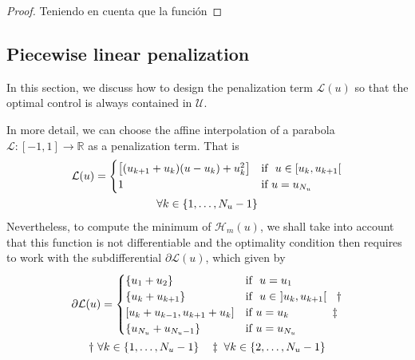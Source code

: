 \begin{proof}
    Teniendo en cuenta que la función 
\end{proof}

\subsection{Piecewise linear penalization}

In this section, we discuss how to design the penalization term $\mathcal{L}(u)$ so that the optimal control is always contained in $\mathcal{U}$. 

In more detail, we can choose the affine interpolation of a parabola $\mathcal{L}:[-1,1] \rightarrow \mathbb{R}$ as a penalization term. That is
\begin{gather}\label{PLP}
    \mathcal{L}(u) = \begin{cases}
        \big[ (u_{k+1}+u_{k}) (u-u_k) + u_k^2 \big] & \text{if }  u \in [u_k,u_{k+1}[ \\
        1 & \text{if } u = u_{N_u} 
    \end{cases} \\
    \notag \forall k \in \{1,\dots,N_u-1\}
\end{gather}
%
Nevertheless, to compute the minimum of $\mathcal{H}_m(u)$, we shall take into account that this function is not differentiable and the optimality condition then requires to work with the subdifferential $\partial\mathcal{L}(u)$, which given by
\begin{gather}
        \partial\mathcal{L}(u)= \begin{cases}
            \{u_1 + u_2  \}   & \text{if } \ u = u_1 \\
            \{u_k + u_{k+1}\}  & \text{if } \ u \in \ ]u_k,u_{k+1}[ \hspace{0.9em} \dagger\\
            [u_k+u_{k-1} ,  u_{k+1}+u_k] & \text{if} \ u = u_k \hspace{3.9em} \ddagger \\
            \{u_{N_u} + u_{N_u-1}  \} & \text{if} \ u = u_{N_u} 
       \end{cases} \\
       \notag \dagger \ \forall k \in \{1,\dots,N_u-1\} \hspace{1em}
       \notag \ddagger  \ \forall k \in \{2,\dots,N_u-1\}
\end{gather} 

